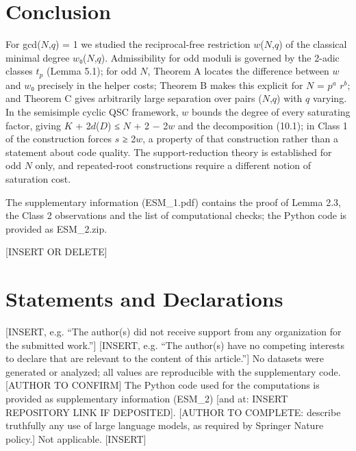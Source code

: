 \documentclass[pdflatex,sn-mathphys-num]{sn-jnl}
\theoremstyle{thmstyleone}
\theoremstyle{thmstylethree}
\begin{document}
\section{Conclusion}

For gcd(\(N\),\(q\)) = 1 we studied the reciprocal-free restriction \(w\)(\(N\),\(q\)) of the classical minimal degree \(w\)₀(\(N\),\(q\)). Admissibility for odd moduli is governed by the 2-adic classes \(t_p\) (Lemma 5.1); for odd \(N\), Theorem A locates the difference between \(w\) and \(w\)₀ precisely in the helper costs; Theorem B makes this explicit for \(N\) = \(p^a\) \(r^b\); and Theorem C gives arbitrarily large separation over pairs (\(N\),\(q\)) with \(q\) varying. In the semisimple cyclic QSC framework, \(w\) bounds the degree of every saturating factor, giving \(K\) + 2\(d\)(\(D\)) ≤ \(N\) + 2 − 2\(w\) and the decomposition (10.1); in Class 1 of \cite{LZ22} the construction forces \(s\) ≥ 2\(w\), a property of that construction rather than a statement about code quality. The support-reduction theory is established for odd \(N\) only, and repeated-root constructions require a different notion of saturation cost.

\backmatter
{}
The supplementary information (ESM\_1.pdf) contains the proof of Lemma 2.3, the Class 2 observations and the list of computational checks; the Python code is provided as ESM\_2.zip.

 [INSERT OR DELETE]

\section*{Statements and Declarations}
 [INSERT, e.g. ``The author(s) did not receive support from any organization for the submitted work.'']
 [INSERT, e.g. ``The author(s) have no competing interests to declare that are relevant to the content of this article.'']
 No datasets were generated or analyzed; all values are reproducible with the supplementary code. [AUTHOR TO CONFIRM]
 The Python code used for the computations is provided as supplementary information (ESM\_2) [and at: INSERT REPOSITORY LINK IF DEPOSITED].
 [AUTHOR TO COMPLETE: describe truthfully any use of large language models, as required by Springer Nature policy.]
 Not applicable.
 [INSERT]


\end{document}
